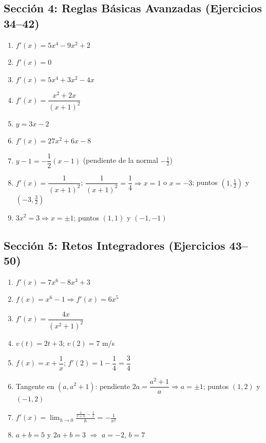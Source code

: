 \documentclass[12pt, letterpaper]{article}
\begin{document}
\subsection*{Sección 4: Reglas Básicas Avanzadas (Ejercicios 34--42)}
\begin{enumerate}[resume=respuestas, leftmargin=*, label=\textbf{\arabic*.}]
  \item $f'(x) = 5x^4 - 9x^2 + 2$
  \item $f'(x) = 0$
  \item $f'(x) = 5x^4 + 3x^2 - 4x$
  \item $f'(x) = \dfrac{x^2 + 2x}{(x + 1)^2}$
  \item $y = 3x - 2$
  \item $f'(x) = 27x^2 + 6x - 8$
  \item $y - 1 = -\dfrac{1}{2}(x - 1)$ \quad (pendiente de la normal $-\frac{1}{2}$)
  \item $f'(x) = \dfrac{1}{(x + 1)^2}$; \quad $\dfrac{1}{(x+1)^2} = \dfrac{1}{4} \Rightarrow x = 1$ o $x = -3$; puntos $\left(1, \frac{1}{2}\right)$ y $\left(-3, \frac{3}{2}\right)$
  \item $3x^2 = 3 \Rightarrow x = \pm 1$; puntos $(1, 1)$ y $(-1, -1)$
\end{enumerate}

\subsection*{Sección 5: Retos Integradores (Ejercicios 43--50)}
\begin{enumerate}[resume=respuestas, leftmargin=*, label=\textbf{\arabic*.}]
  \item $f'(x) = 7x^6 - 8x^3 + 3$
  \item $f(x) = x^6 - 1 \Rightarrow f'(x) = 6x^5$
  \item $f'(x) = \dfrac{4x}{(x^2 + 1)^2}$
  \item $v(t) = 2t + 3$; \quad $v(2) = 7$ m/s
  \item $f(x) = x + \dfrac{1}{x}$; \quad $f'(2) = 1 - \dfrac{1}{4} = \dfrac{3}{4}$
  \item Tangente en $(a, a^2 + 1)$: pendiente $2a = \dfrac{a^2 + 1}{a} \Rightarrow a = \pm 1$; puntos $(1, 2)$ y $(-1, 2)$
  \item $f'(x) = \displaystyle\lim_{h \to 0} \frac{\frac{1}{x+h} - \frac{1}{x}}{h} = -\frac{1}{x^2}$
  \item $a + b = 5$ y $2a + b = 3$ $\Rightarrow$ $a = -2$, $b = 7$
\end{enumerate}
\fi
\end{document}
